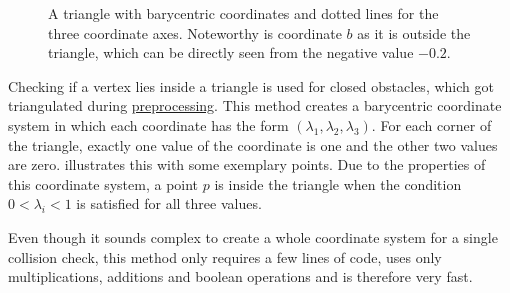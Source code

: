 			\begin{figure}[h]
				\begin{figcenter}
				\end{figcenter}
				\caption{A triangle with barycentric coordinates and dotted lines for the three coordinate axes. Noteworthy is coordinate $b$ as it is outside the triangle, which can be directly seen from the negative value $-0.2$.}
				\label{fig:barycentric-triangle}
			\end{figure}
			
			Checking if a vertex lies inside a triangle is used for closed obstacles, which got triangulated during \hyperref[subsec:step-1-preprocessing]{preprocessing}.
			This method creates a barycentric coordinate system in which each coordinate has the form $(\lambda_1,\lambda_2,\lambda_3)$.
			For each corner of the triangle, exactly one value of the coordinate is one and the other two values are zero.
			 illustrates this with some exemplary points.
			Due to the properties of this coordinate system, a point $p$ is inside the triangle when the condition $0 < \lambda_i < 1$ is satisfied for all three values.
			
			Even though it sounds complex to create a whole coordinate system for a single collision check, this method only requires a few lines of code, uses only multiplications, additions and boolean operations and is therefore very fast.
			
